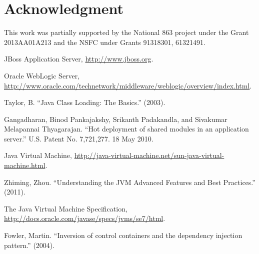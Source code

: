\documentclass[conference]{IEEEtran}
\begin{document}
\section*{Acknowledgment}
This work was partially supported by the National 863 project under the Grant 2013AA01A213 and the NSFC under Grants 91318301, 61321491.




\begin{thebibliography}{9}


JBoss Application Server, \url{http://www.jboss.org}.

Oracle WebLogic Server, \url{http://www.oracle.com/technetwork/middleware/weblogic/overview/index.html}.


Taylor, B. ``Java Class Loading: The Basics.'' (2003).

Gangadharan, Binod Pankajakshy, Srikanth Padakandla, and Sivakumar Melapannai Thyagarajan. ``Hot deployment of shared modules in an application server.'' U.S. Patent No. 7,721,277. 18 May 2010.



Java Virtual Machine, \url{http://java-virtual-machine.net/sun-java-virtual-machine.html}.

Zhiming, Zhou. ``Understanding the JVM Advanced Features and Best Practices.'' (2011).

The Java Virtual Machine Specification, \url{http://docs.oracle.com/javase/specs/jvms/se7/html}.

Fowler, Martin. ``Inversion of control containers and the dependency injection pattern.'' (2004).


\end{thebibliography}
\end{document}
